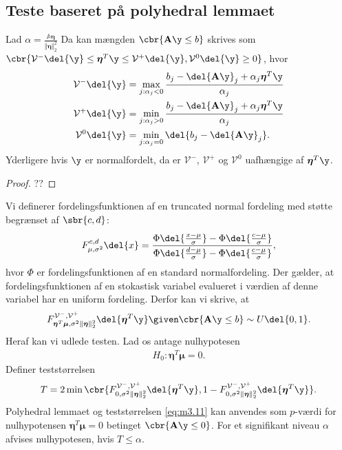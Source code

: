 \subsection{Teste baseret på polyhedral lemmaet}
\begin{lem}
Lad \(\alpha=\frac{\mathbb{A} \boldsymbol{\eta}}{\Vert  \boldsymbol{\eta} \Vert_2^2}\)
Da kan mængden \(\cbr{\mathbf{A} \y \leq b}\) skrives som \(\cbr{\mathcal{V}^- \del{\y} \leq \boldsymbol{\eta}^T \y \leq \mathcal{V}^+ \del{\y}, \mathcal{V}^0 \del{\y} \geq 0} \), hvor
\begin{align*}
\mathcal{V}^- \del{\y} &= \max_{j: \alpha_j <0} \frac{b_j - \del{\mathbf{A} \y}_j + \alpha_j \boldsymbol{\eta}^T \y}{\alpha_j} \\
\mathcal{V}^+ \del{\y} &= \min_{j: \alpha_j >0} \frac{b_j - \del{\mathbf{A} \y}_j + \alpha_j \boldsymbol{\eta}^T \y}{\alpha_j} \\
\mathcal{V}^0 \del{\y} &= \min_{j: \alpha_j =0} \del{b_j - \del{\mathbf{A} \y}_j}.
\end{align*}
Yderligere hvis \(\y\) er normalfordelt, da er \(\mathcal{V}^-\),  \(\mathcal{V}^+\) og  \(\mathcal{V}^0\) uafhængige af \(\boldsymbol{\eta}^T \y\). 
\end{lem}
\begin{proof}
??
\end{proof}

Vi definerer fordelingsfunktionen af en truncated normal fordeling med støtte begrænset af \(\sbr{c,d}\):
\begin{align*}
F_{\mu, \sigma^2}^{c,d} \del{x} = \frac{\Phi\del{\frac{x-\mu}{\sigma}} - \Phi\del{\frac{c-\mu}{\sigma}}}{\Phi\del{\frac{d-\mu}{\sigma}} - \Phi\del{\frac{c-\mu}{\sigma}}},
\end{align*}
hvor \(\Phi\) er fordelingsfunktionen af en standard normalfordeling.
Der gælder, at fordelingsfunktionen af en stokastisk variabel evalueret i værdien af denne variabel har en uniform fordeling. 
Derfor kan vi skrive, at
\begin{align}
F_{\boldsymbol{\eta}^T \boldsymbol{\mu}, \sigma^2 \Vert \boldsymbol{\eta} \Vert_2^2}^{\mathcal{V}^-, \mathcal{V}^+} \del{\boldsymbol{\eta}^T \y} \given \cbr{\mathbf{A} \y \leq b} \sim U \del{0,1}. \label{eq:m3.10}
\end{align}
Heraf kan vi udlede testen. 
Lad os antage nulhypotesen
\begin{align*}
H_0: \boldsymbol{\eta}^T \boldsymbol{\mu}=0.
\end{align*}
Definer teststørrelsen
\begin{align}
T=2 \min\cbr{F_{0, \sigma^2 \Vert \boldsymbol{\eta} \Vert_2^2}^{\mathcal{V}^-, \mathcal{V}^+} \del{\boldsymbol{\eta}^T \y}, 1 - F_{0, \sigma^2 \Vert \boldsymbol{\eta} \Vert_2^2}^{\mathcal{V}^-, \mathcal{V}^+} \del{\boldsymbol{\eta}^T \y}}. \label{eq:m3.11}
\end{align}
Polyhedral lemmaet og teststørrelsen \eqref{eq:m3.11} kan anvendes som \(p\)-værdi for nulhypotensen $\boldsymbol{\eta}^T \boldsymbol{\mu}=0$ betinget \(\cbr{\mathbf{A} \y \leq 0}\).
For et signifikant niveau \(\alpha\) afvises nulhypotesen, hvis $T \leq \alpha$.

